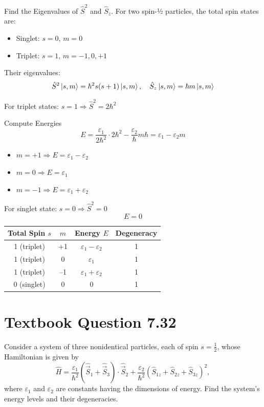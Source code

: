 \documentclass[12pt]{article}
\begin{document}
        Find the Eigenvalues of \( \hat{S}^2 \) and \( \hat{S}_z \). For two spin-½ particles, the total spin states are:
        \begin{itemize}
            \item Singlet: \( s = 0 \), \( m = 0 \)
            \item Triplet: \( s = 1 \), \( m = -1, 0, +1 \)
        \end{itemize}

        Their eigenvalues:
        \[
            \hat{S}^2 \ket{s, m} = \hbar^2 s(s+1) \ket{s, m}, \quad
            \hat{S}_z \ket{s, m} = \hbar m \ket{s, m}
        \]

        For triplet states: 
        \( 
            s = 1 \Rightarrow \hat{S}^2 = 2 \hbar^2 
        \)

        Compute Energies
        \[
        E = \frac{\varepsilon_1}{2\hbar^2} \cdot 2\hbar^2 - \frac{\varepsilon_2}{\hbar} m\hbar = \varepsilon_1 - \varepsilon_2 m
        \]

        \begin{itemize}
            \item \( m = +1 \Rightarrow E = \varepsilon_1 - \varepsilon_2 \)
            \item \( m = 0 \Rightarrow E = \varepsilon_1 \)
            \item \( m = -1 \Rightarrow E = \varepsilon_1 + \varepsilon_2 \)
        \end{itemize}

        For singlet state:
        \( 
            s = 0 \Rightarrow \hat{S}^2 = 0 
        \)
        \[
            E = 0
        \]

        \begin{center}
        \begin{tabular}{|c|c|c|c|}
        \hline
        Total Spin \( s \) & \( m \) & Energy \( E \) & Degeneracy \\
        \hline
        1 (triplet) & +1 & \( \varepsilon_1 - \varepsilon_2 \) & 1 \\
        1 (triplet) & 0 & \( \varepsilon_1 \) & 1 \\
        1 (triplet) & –1 & \( \varepsilon_1 + \varepsilon_2 \) & 1 \\
        0 (singlet) & 0 & \( 0 \) & 1 \\
        \hline
        \end{tabular}
        \end{center}

\section{Textbook Question 7.32}
    Consider a system of three nonidentical particles, each of spin \( s = \tfrac{1}{2} \), whose Hamiltonian is given by
    \[
        \hat{H} = \frac{\varepsilon_1}{\hbar^2} (\hat{\vec{S}}_1 + \hat{\vec{S}}_3) \cdot \hat{\vec{S}}_2
        + \frac{\varepsilon_2}{\hbar^2} \left( \hat{S}_{1z} + \hat{S}_{2z} + \hat{S}_{3z} \right)^2,
    \]
    where \( \varepsilon_1 \) and \( \varepsilon_2 \) are constants having the dimensions of energy. Find the system’s energy levels and their degeneracies.
\end{document}
